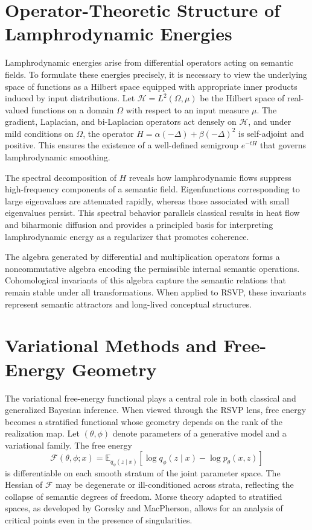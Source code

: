 \documentclass[12pt]{article}
\theoremstyle{plain}
\theoremstyle{definition}
\theoremstyle{remark}
\newcommand{\FreeEnergy}{\mathcal{F}}
\begin{document}
\section{Operator-Theoretic Structure of Lamphrodynamic Energies}
\label{app:operator-theory}

Lamphrodynamic energies arise from differential operators acting on semantic fields. To formulate these energies precisely, it is necessary to view the underlying space of functions as a Hilbert space equipped with appropriate inner products induced by input distributions. Let $\mathcal{H} = L^2(\Omega,\mu)$ be the Hilbert space of real-valued functions on a domain $\Omega$ with respect to an input measure $\mu$. The gradient, Laplacian, and bi-Laplacian operators act densely on $\mathcal{H}$, and under mild conditions on $\Omega$, the operator $H = \alpha(-\Delta) + \beta(-\Delta)^2$ is self-adjoint and positive. This ensures the existence of a well-defined semigroup $e^{-tH}$ that governs lamphrodynamic smoothing.

The spectral decomposition of $H$ reveals how lamphrodynamic flows suppress high-frequency components of a semantic field. Eigenfunctions corresponding to large eigenvalues are attenuated rapidly, whereas those associated with small eigenvalues persist. This spectral behavior parallels classical results in heat flow and biharmonic diffusion and provides a principled basis for interpreting lamphrodynamic energy as a regularizer that promotes coherence.

The algebra generated by differential and multiplication operators forms a noncommutative algebra encoding the permissible internal semantic operations. Cohomological invariants of this algebra capture the semantic relations that remain stable under all transformations. When applied to RSVP, these invariants represent semantic attractors and long-lived conceptual structures.

\section{Variational Methods and Free-Energy Geometry}
\label{app:free-energy-geometry}

The variational free-energy functional plays a central role in both classical and generalized Bayesian inference. When viewed through the RSVP lens, free energy becomes a stratified functional whose geometry depends on the rank of the realization map. Let $(\theta,\phi)$ denote parameters of a generative model and a variational family. The free energy
\[
\FreeEnergy(\theta,\phi;x)
= \mathbb{E}_{q_\phi(z\mid x)}\!\left[\log q_\phi(z\mid x) - \log p_\theta(x,z)\right]
\]
is differentiable on each smooth stratum of the joint parameter space. The Hessian of $\FreeEnergy$ may be degenerate or ill-conditioned across strata, reflecting the collapse of semantic degrees of freedom. Morse theory adapted to stratified spaces, as developed by Goresky and MacPherson, allows for an analysis of critical points even in the presence of singularities.
\end{document}
